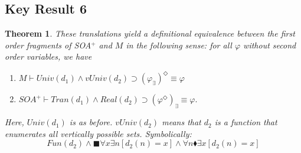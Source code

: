 \documentclass{article}
\newcommand\D{\blacklozenge}
\newcommand\B{\blacksquare}
\newtheorem{theorem}{Theorem}
\begin{document}
\subsection{Key Result 6}
\begin{theorem}
    These translations yield a definitional equivalence 
    between the first order fragments of SOA$^+$ and $M$ in the following sense: for all 
    $\varphi$ without second order variables, we have
    \begin{enumerate}
        \item $M \vdash Univ(d_1) \wedge vUniv(d_2) \supset (\varphi_\exists)^\Diamond \equiv \varphi$
        \item $SOA^+ \vdash Tran(d_1) \wedge Real(d_2) \supset (\varphi^\Diamond)_\exists \equiv \varphi.$
    \end{enumerate}
    Here, $Univ(d_1)$ is as before. $vUniv(d_2)$ means that $d_2$ is a function 
    that enumerates all vertically possible sets. Symbolically:
    \[ Fun(d_2) \wedge \B \forall x \exists n [d_2(n) = x] \wedge \forall n \D \exists x[d_2(n) = x] \]
    \end{theorem}
\end{document}
